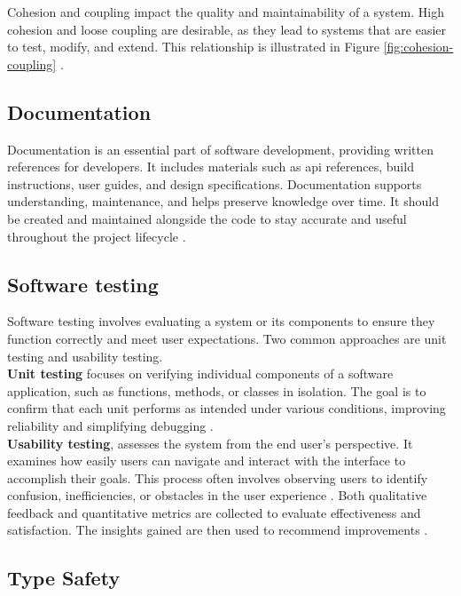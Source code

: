Cohesion and coupling impact the quality and maintainability of a system.
High cohesion and loose coupling are desirable, as they lead to systems that are easier to test, modify, and extend. This relationship is illustrated in Figure \ref{fig:cohesion-coupling} 
\cite{geeksforgeeks:c&c}.

\subsection{Documentation}
\label{subsec:documentation}

Documentation is an essential part of software development, providing written references for developers. It includes materials such as \gls{api} references, build instructions, user guides, and design specifications. Documentation supports understanding, maintenance, and helps preserve knowledge over time. It should be created and maintained alongside the code to stay accurate and useful throughout the project lifecycle \cite{geeksforgeeks:doc}.

\subsection{Software testing}
\label{subsec:testing}

Software testing involves evaluating a system or its components to ensure they function correctly and meet user expectations. Two common approaches are unit testing and usability testing. \\

\textbf{Unit testing} focuses on verifying individual components of a software application, such as functions, methods, or classes in isolation. The goal is to confirm that each unit performs as intended under various conditions, improving reliability and simplifying debugging \cite{geeksforgeeks:unit-test}. \\

\textbf{Usability testing}, assesses the system from the end user’s perspective. It examines how easily users can navigate and interact with the interface to accomplish their goals. This process often involves observing users to identify confusion, inefficiencies, or obstacles in the user experience \cite{geeksforgeeks:user-test}. Both qualitative feedback and quantitative metrics are collected to evaluate effectiveness and satisfaction. The insights gained are then used to recommend improvements \cite{geeksforgeeks:user-test}.

\subsection{Type Safety}
\label{subsec:type-safety}

